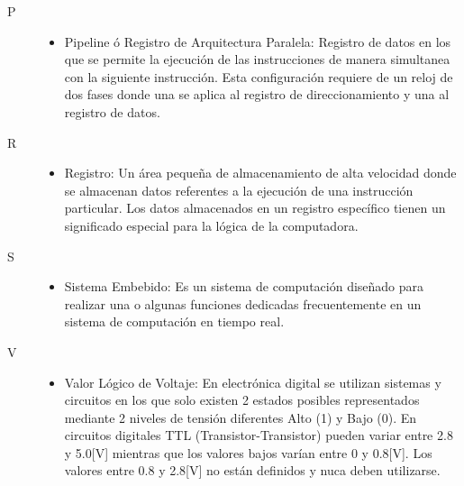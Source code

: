 \documentclass[letterpaper,12pt,oneside]{book}
\begin{document}
\begin{description}
		\item[\LARGE P]
		\hfill
		\begin{itemize}
			\item Pipeline ó Registro de Arquitectura Paralela: Registro de datos en los que se permite la ejecución de las instrucciones de manera simultanea con la siguiente instrucción. Esta configuración requiere de un reloj de dos fases donde una se aplica al registro de direccionamiento y una al registro de datos.\cite{mano1994arquitectura}
		\end{itemize}

		\item[\LARGE R]
		\hfill
		\begin{itemize}
			\item Registro: Un área pequeña de almacenamiento de alta velocidad donde se almacenan datos referentes a la ejecución de una instrucción particular. Los datos almacenados en un registro específico tienen un significado especial para la lógica de la computadora. %
		\end{itemize}

		\item[\LARGE S]
		\hfill
		\begin{itemize}
			\item Sistema Embebido: Es un sistema de computación diseñado para realizar una o algunas funciones dedicadas frecuentemente en un sistema de computación en tiempo real.\cite{aguirre2014sistema}
		\end{itemize}

		\item[\LARGE V]
		\hfill
		\begin{itemize}
			\item Valor Lógico de Voltaje: En electrónica digital se utilizan sistemas y circuitos en los que solo existen 2 estados posibles representados mediante 2 niveles de tensión diferentes Alto (1) y Bajo (0). En circuitos digitales TTL (Transistor-Transistor) pueden variar entre 2.8 y 5.0[V] mientras que los valores bajos varían entre 0 y 0.8[V]. Los valores entre 0.8 y 2.8[V] no están definidos y nuca deben utilizarse.
		\end{itemize}
	\end{description}
	
	
	
\end{document}
